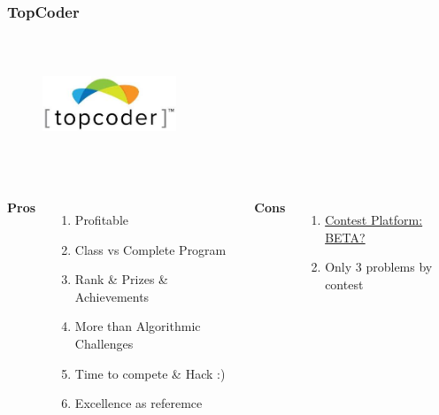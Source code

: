 \documentclass{beamer}
\begin{document}
\begin{frame}
	\frametitle{TopCoder}
	\begin{figure}[t]
		\href{https://arena.topcoder.com/index.html}{\includegraphics[width=4cm,height=4cm,keepaspectratio]{images/judges/topcoder}}
	\end{figure}
	
	\begin{columns}[c] %
		\textbf{Pros}
		\begin{enumerate}
			\item Profitable 
			\item Class vs Complete Program 
			\item Rank \& Prizes \& Achievements
			\item More than Algorithmic Challenges
			\item Time to compete \& Hack :)
			\item Excellence as referemce
		\end{enumerate}
		\textbf{Cons}
		\begin{enumerate}
			\item \href{https://arena.topcoder.com/index.html}{Contest Platform: BETA?}
			\item Only 3 problems by contest
		\end{enumerate}
	\end{columns}

\end{frame}
\end{document}
